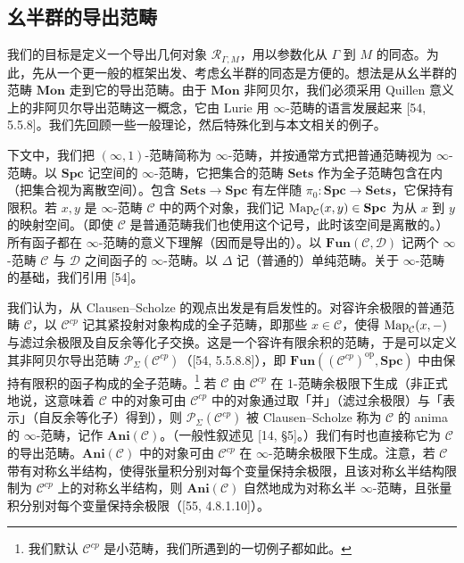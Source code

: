 \subsection{幺半群的导出范畴}

我们的目标是定义一个导出几何对象 $\mathcal R_{\Gamma,M}$，用以参数化从 $\Gamma$ 到 $M$ 的同态。为此，先从一个更一般的框架出发、考虑幺半群的同态是方便的。想法是从幺半群的范畴 $\mathbf{Mon}$ 走到它的导出范畴。由于 $\mathbf{Mon}$ 非阿贝尔，我们必须采用 Quillen 意义上的非阿贝尔导出范畴这一概念，它由 Lurie 用 $\infty$-范畴的语言发展起来 [54, 5.5.8]。我们先回顾一些一般理论，然后特殊化到与本文相关的例子。

下文中，我们把 $(\infty,1)$-范畴简称为 $\infty$-范畴，并按通常方式把普通范畴视为 $\infty$-范畴。以 $\mathbf{Spc}$ 记空间的 $\infty$-范畴，它把集合的范畴 $\mathbf{Sets}$ 作为全子范畴包含在内（把集合视为离散空间）。包含 $\mathbf{Sets}\to\mathbf{Spc}$ 有左伴随 $\pi_0:\mathbf{Spc}\to\mathbf{Sets}$，它保持有限积。若 $x,y$ 是 $\infty$-范畴 $\mathcal C$ 中的两个对象，我们记 $\operatorname{Map}_{\mathcal C}(x,y)\in\mathbf{Spc}$ 为从 $x$ 到 $y$ 的映射空间。（即使 $\mathcal C$ 是普通范畴我们也使用这个记号，此时该空间是离散的。）所有函子都在 $\infty$-范畴的意义下理解（因而是导出的）。以 $\mathbf{Fun}(\mathcal C,\mathcal D)$ 记两个 $\infty$-范畴 $\mathcal C$ 与 $\mathcal D$ 之间函子的 $\infty$-范畴。以 $\Delta$ 记（普通的）单纯范畴。关于 $\infty$-范畴的基础，我们引用 [54]。

我们认为，从 Clausen–Scholze 的观点出发是有启发性的。对容许余极限的普通范畴 $\mathcal C$，以 $\mathcal C^{cp}$ 记其紧投射对象构成的全子范畴，即那些 $x\in\mathcal C$，使得 $\operatorname{Map}_{\mathcal C}(x,-)$ 与滤过余极限及自反余等化子交换。这是一个容许有限余积的范畴，于是可以定义其非阿贝尔导出范畴 $\mathcal P_\Sigma(\mathcal C^{cp})$（[54, 5.5.8.8]），即 $\mathbf{Fun}((\mathcal C^{cp})^{\mathrm{op}},\mathbf{Spc})$ 中由保持有限积的函子构成的全子范畴。\footnote{我们默认 $\mathcal C^{cp}$ 是小范畴，我们所遇到的一切例子都如此。} 若 $\mathcal C$ 由 $\mathcal C^{cp}$ 在 1-范畴余极限下生成（非正式地说，这意味着 $\mathcal C$ 中的对象可由 $\mathcal C^{cp}$ 中的对象通过取「并」（滤过余极限）与「表示」（自反余等化子）得到），则 $\mathcal P_\Sigma(\mathcal C^{cp})$ 被 Clausen–Scholze 称为 $\mathcal C$ 的 anima 的 $\infty$-范畴，记作 $\mathbf{Ani}(\mathcal C)$。（一般性叙述见 [14, §5]。）我们有时也直接称它为 $\mathcal C$ 的导出范畴。$\mathbf{Ani}(\mathcal C)$ 中的对象可由 $\mathcal C^{cp}$ 在 $\infty$-范畴余极限下生成。注意，若 $\mathcal C$ 带有对称幺半结构，使得张量积分别对每个变量保持余极限，且该对称幺半结构限制为 $\mathcal C^{cp}$ 上的对称幺半结构，则 $\mathbf{Ani}(\mathcal C)$ 自然地成为对称幺半 $\infty$-范畴，且张量积分别对每个变量保持余极限（[55, 4.8.1.10]）。

